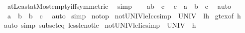 \begin{isabellebody}
\ atLeastatMost{\isacharunderscore}{\kern0pt}empty{\isacharunderscore}{\kern0pt}iff{\isacharbrackleft}{\kern0pt}symmetric{\isacharbrackright}{\kern0pt}\ \isamarkupfalse%
\ simp\isanewline
\ \ \isamarkupfalse%
\ {\isacartoucheopen}{\isacharbraceleft}{\kern0pt}a{\isachardot}{\kern0pt}{\isachardot}{\kern0pt}b{\isacharbraceright}{\kern0pt}\ {\isacharequal}{\kern0pt}\ {\isacharbraceleft}{\kern0pt}c{\isacharbraceright}{\kern0pt}{\isacartoucheclose}\ \isamarkupfalse%
\ {\isachardoublequoteopen}c\ {\isasymle}\ a\ {\isasymand}\ b\ {\isasymle}\ c{\isachardoublequoteclose}\ \isamarkupfalse%
\ auto\isanewline
\ \ \isamarkupfalse%
\ {\isacharasterisk}{\kern0pt}\ \isamarkupfalse%
\ {\isachardoublequoteopen}a\ {\isacharequal}{\kern0pt}\ b\ {\isasymand}\ b\ {\isacharequal}{\kern0pt}\ c{\isachardoublequoteclose}\ \isamarkupfalse%
\ auto\isanewline
{}\isamarkupfalse%
\ simp%
\endisatagproof
{\isafoldproof}%
%
\isadelimproof
\isanewline
%
\endisadelimproof
\isanewline
{}\isamarkupfalse%
\isanewline
\isanewline
{}\isamarkupfalse%
\ no{\isacharunderscore}{\kern0pt}top\isanewline
{}\isanewline
\isanewline
\isanewline
{}\isamarkupfalse%
\ not{\isacharunderscore}{\kern0pt}UNIV{\isacharunderscore}{\kern0pt}le{\isacharunderscore}{\kern0pt}Icc{\isacharbrackleft}{\kern0pt}simp{\isacharbrackright}{\kern0pt}{\isacharcolon}{\kern0pt}\ {\isachardoublequoteopen}{\isasymnot}\ UNIV\ {\isasymsubseteq}\ {\isacharbraceleft}{\kern0pt}l{\isachardot}{\kern0pt}{\isachardot}{\kern0pt}h{\isacharbraceright}{\kern0pt}{\isachardoublequoteclose}\isanewline
%
\isadelimproof
%
\endisadelimproof
%
\isatagproof
{}\isamarkupfalse%
\ gt{\isacharunderscore}{\kern0pt}ex{\isacharbrackleft}{\kern0pt}of\ h{\isacharbrackright}{\kern0pt}\ \isamarkupfalse%
{\isacharparenleft}{\kern0pt}auto\ simp{\isacharcolon}{\kern0pt}\ subset{\isacharunderscore}{\kern0pt}eq\ less{\isacharunderscore}{\kern0pt}le{\isacharunderscore}{\kern0pt}not{\isacharunderscore}{\kern0pt}le{\isacharparenright}{\kern0pt}%
\endisatagproof
{\isafoldproof}%
%
\isadelimproof
\isanewline
%
\endisadelimproof
\isanewline
{}\isamarkupfalse%
\ not{\isacharunderscore}{\kern0pt}UNIV{\isacharunderscore}{\kern0pt}le{\isacharunderscore}{\kern0pt}Iic{\isacharbrackleft}{\kern0pt}simp{\isacharbrackright}{\kern0pt}{\isacharcolon}{\kern0pt}\ {\isachardoublequoteopen}{\isasymnot}\ UNIV\ {\isasymsubseteq}\ {\isacharbraceleft}{\kern0pt}{\isachardot}{\kern0pt}{\isachardot}{\kern0pt}h{\isacharbraceright}{\kern0pt}{\isachardoublequoteclose}\isanewline

\end{isabellebody}
